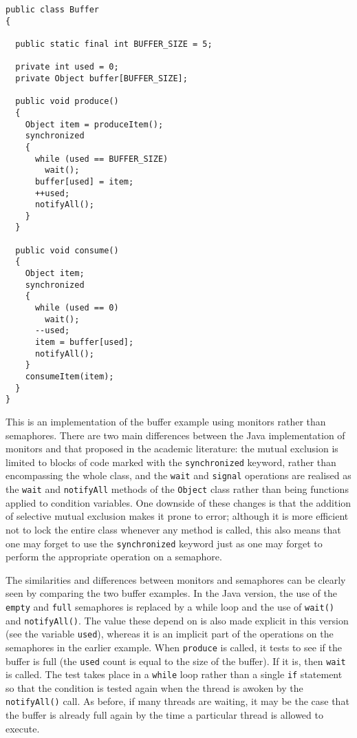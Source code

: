 \begin{verbatim}
public class Buffer
{

  public static final int BUFFER_SIZE = 5;

  private int used = 0;
  private Object buffer[BUFFER_SIZE];
  
  public void produce()
  {
    Object item = produceItem();
    synchronized
    {
      while (used == BUFFER_SIZE)
        wait();
      buffer[used] = item;
      ++used;
      notifyAll();
    }
  }

  public void consume()
  {
    Object item;
    synchronized
    {
      while (used == 0)
        wait();
      --used;
      item = buffer[used];
      notifyAll();
    }
    consumeItem(item);
  }
}
\end{verbatim}

This is an implementation of the buffer example using monitors rather
than semaphores.  There are two main differences between the Java
implementation of monitors and that proposed in the academic
literature: the mutual exclusion is limited to blocks of code marked
with the \texttt{synchronized} keyword, rather than encompassing the
whole class, and the \texttt{wait} and \texttt{signal} operations are
realised as the \texttt{wait} and \texttt{notifyAll} methods of the
\texttt{Object} class rather than being functions applied to condition
variables.  One downside of these changes is that the addition of
selective mutual exclusion makes it prone to error; although it is
more efficient not to lock the entire class whenever any method is
called, this also means that one may forget to use the
\texttt{synchronized} keyword just as one may forget to perform the
appropriate operation on a semaphore.

The similarities and differences between monitors and semaphores can
be clearly seen by comparing the two buffer examples.  In the Java
version, the use of the \texttt{empty} and \texttt{full} semaphores is
replaced by a while loop and the use of \texttt{wait()} and
\texttt{notifyAll()}.  The value these depend on is also made explicit
in this version (see the variable \texttt{used}), whereas it is an
implicit part of the operations on the semaphores in the earlier
example.  When \texttt{produce} is called, it tests to see if the
buffer is full (the \texttt{used} count is equal to the size of the
buffer).  If it is, then \texttt{wait} is called.  The test takes
place in a \texttt{while} loop rather than a single \texttt{if}
statement so that the condition is tested again when the thread is
awoken by the \texttt{notifyAll()} call.  As before, if many threads
are waiting, it may be the case that the buffer is already full again
by the time a particular thread is allowed to execute.

